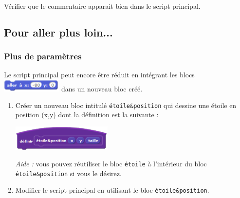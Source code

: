 


Vérifier que le commentaire apparait bien dans le script principal.


\subsection{Pour aller plus loin...}

\subsubsection{Plus de paramètres}

Le script principal peut encore être réduit en intégrant les blocs \includegraphics[width=3cm]{./images/scratch03/fonction/Scratch_Fonctions_11} dans un nouveau bloc créé.

\begin{enumerate}
\item Créer un nouveau bloc intitulé \texttt{étoile\&position} qui dessine une étoile en position (x,y) dont la définition est la suivante :
\begin{center}\includegraphics[width=5cm]{./images/scratch03/fonction/Scratch_Fonctions_12}\end{center}

\emph{Aide :} vous pouvez réutiliser le bloc \texttt{étoile} à l’intérieur du bloc \texttt{étoile\&position} si vous le désirez.

\item Modifier le script principal en utilisant le bloc \texttt{étoile\&position}.
\end{enumerate}

